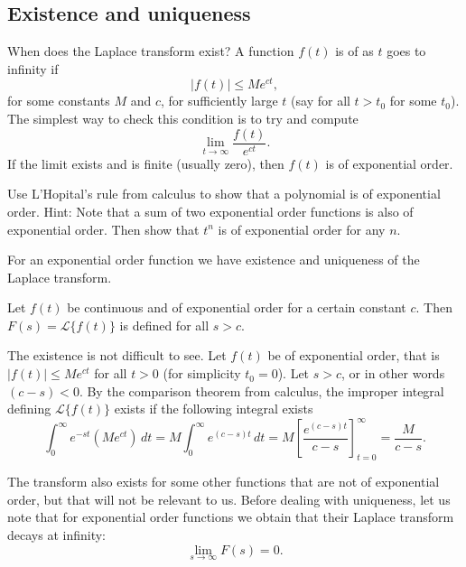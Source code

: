 \subsection{Existence and uniqueness}

When does the Laplace transform exist?  A function $f(t)$ is of
\emph{} as $t$ goes to infinity if
\begin{equation*}
\lvert f(t) \rvert \leq M e^{ct} ,
\end{equation*}
for some constants $M$ and $c$, for
sufficiently large $t$ (say for all $t > t_0$ for some $t_0$).  The simplest
way to check this condition is to try and compute
\begin{equation*}
\lim_{t\to \infty} \frac{f(t)}{e^{ct}} .
\end{equation*}
If the limit exists and is finite (usually zero), then $f(t)$ is of
exponential order.

\begin{exercise}
Use L'Hopital's rule from calculus to show that a polynomial is of
exponential order.  Hint: Note that a sum of two exponential order functions
is also of exponential order.  Then show that $t^n$ is of exponential order
for any $n$.
\end{exercise}

For an exponential order function we have existence and uniqueness of the
Laplace transform.

\begin{theorem}[Existence]
Let $f(t)$ be continuous and of exponential order for a certain
constant $c$.  Then $F(s) = \mathcal{L} \bigl\{ f(t) \bigr\}$ is defined for
all $s > c$.
\end{theorem}

The existence is not difficult to see.  Let $f(t)$ be of exponential order,
that is $\lvert f(t) \rvert \leq M e^{ct}$ for all $t > 0$ (for simplicity $t_0 = 0$).
Let $s > c$, or in other words $(c-s) < 0$.
By the comparison theorem from calculus, the improper integral defining
$\mathcal{L} \bigl\{ f(t) \bigr\}$ exists if the following integral exists
\begin{equation*}
\int_0^\infty e^{-st} ( M e^{ct} ) \,dt
=
M \int_0^\infty e^{(c-s)t} \,dt = M \left[ \frac{e^{(c-s)t}}{c-s}
\right]_{t=0}^\infty = \frac{M}{c-s} .
\end{equation*}

The transform also exists for some other functions
that are not of exponential
order, but that will not be relevant to us.
Before dealing with uniqueness, let
us note that for exponential order functions we obtain that their
Laplace transform decays at infinity:
\begin{equation*}
\lim_{s\to\infty} F(s) = 0 .
\end{equation*}

